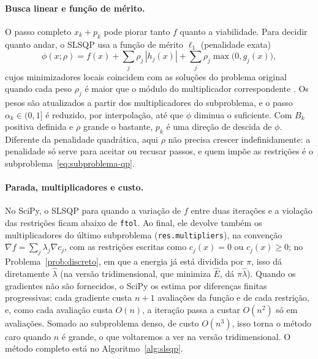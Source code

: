 \documentclass[12pt, oneside, a4paper, english, brazil]{abntex2}
\theoremstyle{relatorio}
\theoremstyle{relatorioit}
\theoremstyle{problema}
\newcommand{\code}[1]{{\renewcommand{\_}{\textunderscore\allowbreak}\texttt{#1}}}
\newcommand{\lh}{\hat\lambda}
\newcommand{\Eh}{\hat E}
\begin{document}
\paragraph{Busca linear e função de mérito.} O passo completo $x_k + p_k$ pode piorar
tanto $f$ quanto a viabilidade. Para decidir quanto andar, o SLSQP usa a função de
mérito $\ell_1$ (penalidade exata)
\begin{equation}
  \phi(x; \rho) = f(x) + \sum_j \rho_j\, |h_j(x)| + \sum_j \rho_j \max\bigl(0, g_j(x)\bigr),
  \label{eq:merito}
\end{equation}
cujos minimizadores locais coincidem com as soluções do problema original quando cada
peso $\rho_j$ é maior que o módulo do multiplicador correspondente
\parencite[seção~15.4]{nocedal2006}. Os pesos são atualizados a partir dos
multiplicadores do subproblema, e o passo $\alpha_k \in (0, 1]$ é reduzido, por
interpolação, até que $\phi$ diminua o suficiente. Com $B_k$ positiva definida e
$\rho$ grande o bastante, $p_k$ é uma direção de descida de $\phi$. Diferente da
penalidade quadrática, aqui $\rho$ não precisa crescer indefinidamente: a penalidade
só serve para aceitar ou recusar passos, e quem impõe as restrições é o
subproblema~\eqref{eq:subproblema-qp}.

\paragraph{Parada, multiplicadores e custo.} No SciPy, o SLSQP para quando a variação
de $f$ entre duas iterações e a violação das restrições ficam abaixo de \code{ftol}.
Ao final, ele devolve também os multiplicadores do último subproblema
(\code{res.multipliers}), na convenção $\nabla f = \sum_j \lambda_j \nabla c_j$, com as
restrições escritas como $c_j(x) = 0$ ou $c_j(x) \ge 0$; no
Problema~\ref{prob:discreto}, em que a energia já está dividida por $\pi$, isso dá
diretamente $\lh$ (na versão tridimensional, que minimiza $\Eh$, dá $\pi\lh$). Quando os gradientes não
são fornecidos, o SciPy os estima por diferenças finitas progressivas: cada gradiente
custa $n + 1$ avaliações da função e de cada restrição, e, como cada avaliação custa
$O(n)$, a iteração passa a custar $O(n^2)$ só em avaliações. Somado ao subproblema
denso, de custo $O(n^3)$, isso torna o método caro quando $n$ é grande, o que
voltaremos a ver na versão tridimensional. O método completo está no
Algoritmo~\ref{alg:slsqp}.
\end{document}
